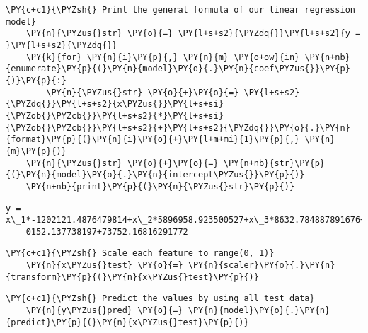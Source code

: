     
        \begin{tcolorbox}[breakable, size=fbox, boxrule=1pt, pad at break*=1mm,colback=cellbackground, colframe=cellborder]
    \begin{Verbatim}[commandchars=\\\{\}]
    \PY{c+c1}{\PYZsh{} Print the general formula of our linear regression model}
    \PY{n}{\PYZus{}str} \PY{o}{=} \PY{l+s+s2}{\PYZdq{}}\PY{l+s+s2}{y = }\PY{l+s+s2}{\PYZdq{}}
    \PY{k}{for} \PY{n}{i}\PY{p}{,} \PY{n}{m} \PY{o+ow}{in} \PY{n+nb}{enumerate}\PY{p}{(}\PY{n}{model}\PY{o}{.}\PY{n}{coef\PYZus{}}\PY{p}{)}\PY{p}{:}
        \PY{n}{\PYZus{}str} \PY{o}{+}\PY{o}{=} \PY{l+s+s2}{\PYZdq{}}\PY{l+s+s2}{x\PYZus{}}\PY{l+s+si}{\PYZob{}\PYZcb{}}\PY{l+s+s2}{*}\PY{l+s+si}{\PYZob{}\PYZcb{}}\PY{l+s+s2}{+}\PY{l+s+s2}{\PYZdq{}}\PY{o}{.}\PY{n}{format}\PY{p}{(}\PY{n}{i}\PY{o}{+}\PY{l+m+mi}{1}\PY{p}{,} \PY{n}{m}\PY{p}{)}
    \PY{n}{\PYZus{}str} \PY{o}{+}\PY{o}{=} \PY{n+nb}{str}\PY{p}{(}\PY{n}{model}\PY{o}{.}\PY{n}{intercept\PYZus{}}\PY{p}{)}
    \PY{n+nb}{print}\PY{p}{(}\PY{n}{\PYZus{}str}\PY{p}{)}
    \end{Verbatim}
    \end{tcolorbox}
    
        \begin{Verbatim}[commandchars=\\\{\}]
    y = x\_1*-1202121.4876479814+x\_2*5896958.923500527+x\_3*8632.784887891676+x\_4*-335
    0152.137738197+73752.16816291772
        \end{Verbatim}


        \begin{tcolorbox}[breakable, size=fbox, boxrule=1pt, pad at break*=1mm,colback=cellbackground, colframe=cellborder]
    \begin{Verbatim}[commandchars=\\\{\}]
    \PY{c+c1}{\PYZsh{} Scale each feature to range(0, 1)}
    \PY{n}{x\PYZus{}test} \PY{o}{=} \PY{n}{scaler}\PY{o}{.}\PY{n}{transform}\PY{p}{(}\PY{n}{x\PYZus{}test}\PY{p}{)}
    \end{Verbatim}
    \end{tcolorbox}
            
        \begin{tcolorbox}[breakable, size=fbox, boxrule=1pt, pad at break*=1mm,colback=cellbackground, colframe=cellborder]
    \begin{Verbatim}[commandchars=\\\{\}]
    \PY{c+c1}{\PYZsh{} Predict the values by using all test data}
    \PY{n}{y\PYZus{}pred} \PY{o}{=} \PY{n}{model}\PY{o}{.}\PY{n}{predict}\PY{p}{(}\PY{n}{x\PYZus{}test}\PY{p}{)}
    \end{Verbatim}
    \end{tcolorbox}
    
